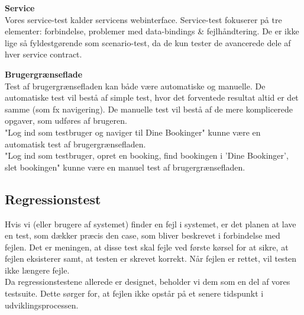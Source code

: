 \textbf{Service}
\\Vores service-test kalder servicens webinterface. Service-test fokuserer på tre elementer: forbindelse, problemer med data-bindings \& fejlhåndtering. De er ikke lige så fyldestgørende som scenario-test, da de kun tester de avancerede dele af hver service contract.

\textbf{Brugergrænseflade}
\\Test af brugergrænsefladen kan både være automatiske og manuelle. De automatiske test vil bestå af simple test, hvor det forventede resultat altid er det samme (som fx navigering). De manuelle test vil bestå af de mere komplicerede opgaver, som udføres af brugeren.
\\"Log ind som testbruger og naviger til Dine Bookinger" kunne være en automatisk test af brugergrænsefladen.
\\"Log ind som testbruger, opret en booking, find bookingen i 'Dine Bookinger', slet bookingen" kunne være en manuel test af brugergrænsefladen.

\subsection*{Regressionstest}
\label{Test_intendedStrat_regression}
Hvis vi (eller brugere af systemet) finder en fejl i systemet, er det planen at lave en test, som dækker præcis den case, som bliver beskrevet i forbindelse med fejlen. Det er meningen, at disse test skal fejle ved første kørsel for at sikre, at fejlen eksisterer samt, at testen er skrevet korrekt. Når fejlen er rettet, vil testen ikke længere fejle.
\\Da regressionstestene allerede er designet, beholder vi dem som en del af vores testsuite. Dette sørger for, at fejlen ikke opstår på et senere tidspunkt i udviklingsprocessen.

